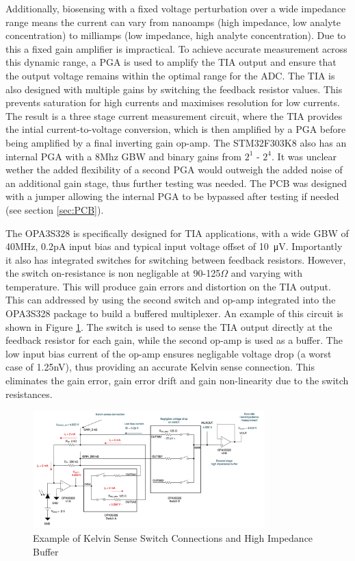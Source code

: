 Additionally, biosensing with a fixed voltage perturbation over a wide impedance range means the current can vary from nanoamps (high impedance, low analyte concentration) to milliamps (low impedance, high analyte concentration). Due to this a fixed gain amplifier is impractical. To achieve accurate measurement across this dynamic range, a \ac{PGA} is used to amplify the TIA output and ensure that the output voltage remains within the optimal range for the \ac{ADC}. The TIA is also designed with multiple gains by switching the feedback resistor values. This prevents saturation for high currents and maximises resolution for low currents. The result is a three stage current measurement circuit, where the TIA provides the intial current-to-voltage conversion, which is then amplified by a \ac{PGA} before being amplified by a final inverting gain op-amp. The STM32F303K8 also has an internal PGA with a 8Mhz GBW and binary gains from $2^1$ - $2^4$. It was unclear wether the added flexibility of a second PGA would outweigh the added noise of an additional gain stage, thus further testing was needed. The PCB was designed with a jumper allowing the internal PGA to be bypassed after testing if needed (see section \ref{sec:PCB}).

The OPA3S328 is specifically designed for TIA applications, with a wide GBW of 40MHz, 0.2pA input bias and typical input voltage offset of \SI{10}{\micro\volt}. Importantly it also has integrated switches for switching between feedback resistors. However, the switch on-resistance is non negligable at 90-125$\Omega$ and varying with temperature. This will produce gain errors and distortion on the TIA output. This can addressed by using the second switch and op-amp integrated into the OPA3S328 package to build a buffered multiplexer. An example of this circuit is shown in Figure \ref{fig:kelvin_sense_tia}. The switch is used to sense the TIA output directly at the feedback resistor for each gain, while the second op-amp is used as a buffer. The low input bias current of the op-amp ensures negligable voltage drop (a worst case of 1.25nV), thus providing an accurate Kelvin sense connection. This eliminates the gain error, gain error drift and gain non-linearity due to the switch resistances.

\begin{figure}[]
    \centering
    \includegraphics[width=0.8\textwidth]{KelvinSenseTIA.png}
    \caption{Example of Kelvin Sense Switch Connections and High Impedance Buffer\cite{chioyeBuildProgrammableGain2021}}
    \label{fig:kelvin_sense_tia}
\end{figure}

